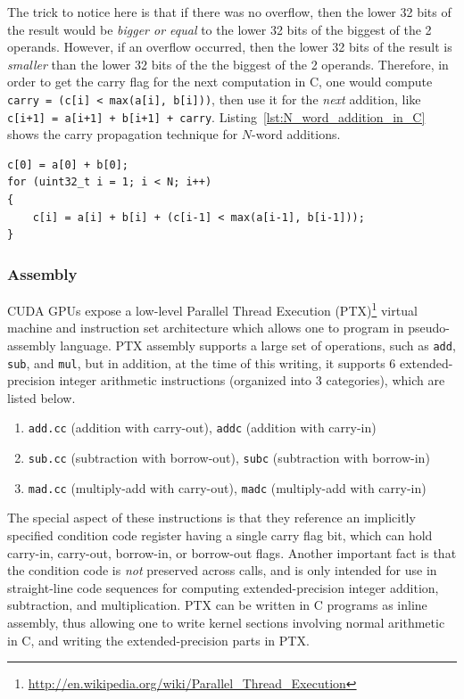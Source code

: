 \documentclass[12pt, a4paper]{report}
\begin{document}
The trick to notice here is that if there was no overflow, then the lower 32
bits of the result would be \emph{bigger or equal} to the lower 32 bits of the
biggest of the 2 operands.
However, if an overflow occurred, then the lower 32 bits of the result is
\emph{smaller} than the lower 32 bits of the the biggest of the 2 operands.
Therefore, in order to get the carry flag for the next computation in C, one
would compute \verb!carry = (c[i] < max(a[i], b[i]))!, then use it for the
\emph{next} addition, like \verb!c[i+1] = a[i+1] + b[i+1] + carry!.
Listing~\ref{lst:N_word_addition_in_C} shows the carry propagation technique for
$N$-word additions.

\begin{lstlisting}
c[0] = a[0] + b[0];
for (uint32_t i = 1; i < N; i++)
{
    c[i] = a[i] + b[i] + (c[i-1] < max(a[i-1], b[i-1]));
}
\end{lstlisting}

\subsubsection{Assembly}
CUDA GPUs expose a low-level Parallel Thread Execution (PTX)\footnote{\url{http://en.wikipedia.org/wiki/Parallel_Thread_Execution}} virtual
machine and instruction set architecture which allows one to program in
pseudo-assembly language.
PTX assembly supports a large set of operations, such as \verb+add+, \verb+sub+,
and \verb+mul+, but in addition, at the time of this writing, it supports 6
extended-precision integer arithmetic instructions (organized into 3
categories), which are listed below.

\begin{enumerate}
\item \verb+add.cc+ (addition with carry-out), \verb+addc+ (addition with
carry-in)
\item \verb+sub.cc+ (subtraction with borrow-out), \verb+subc+ (subtraction with
borrow-in)
\item \verb+mad.cc+ (multiply-add with carry-out), \verb+madc+ (multiply-add
with carry-in)
\end{enumerate}

The special aspect of these instructions is that they reference an implicitly
specified condition code register having a single carry flag bit, which can hold
carry-in, carry-out, borrow-in, or borrow-out flags.
Another important fact is that the condition code is \emph{not} preserved across
calls, and is only intended for use in straight-line code sequences for
computing extended-precision integer addition, subtraction, and multiplication.
PTX can be written in C programs as inline assembly, thus allowing one to write
kernel sections involving normal arithmetic in C, and writing the
extended-precision parts in PTX.
\end{document}
